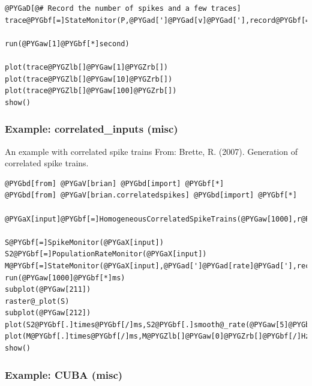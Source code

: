 \documentclass[letterpaper,10pt,english]{manual}
\begin{document}
\begin{Verbatim}[commandchars=@\[\]]
@PYGaD[@# Record the number of spikes and a few traces]
trace@PYGbf[=]StateMonitor(P,@PYGad[']@PYGad[v]@PYGad['],record@PYGbf[=]@PYGZlb[]@PYGaw[1],@PYGaw[10],@PYGaw[100]@PYGZrb[])

run(@PYGaw[1]@PYGbf[*]second)

plot(trace@PYGZlb[]@PYGaw[1]@PYGZrb[])
plot(trace@PYGZlb[]@PYGaw[10]@PYGZrb[])
plot(trace@PYGZlb[]@PYGaw[100]@PYGZrb[])
show()
\end{Verbatim}

\resetcurrentobjects
\hypertarget{--doc-examples-misc_correlated_inputs}{}

\hypertarget{index-61}{}\subsubsection{Example: correlated\_inputs (misc)}

An example with correlated spike trains
From: Brette, R. (2007). Generation of correlated spike trains.

\begin{Verbatim}[commandchars=@\[\]]
@PYGbd[from] @PYGaV[brian] @PYGbd[import] @PYGbf[*]
@PYGbd[from] @PYGaV[brian.correlatedspikes] @PYGbd[import] @PYGbf[*]

@PYGaX[input]@PYGbf[=]HomogeneousCorrelatedSpikeTrains(@PYGaw[1000],r@PYGbf[=]@PYGaw[10]@PYGbf[*]Hz,c@PYGbf[=]@PYGaw[0.1],tauc@PYGbf[=]@PYGaw[10]@PYGbf[*]ms)

S@PYGbf[=]SpikeMonitor(@PYGaX[input])
S2@PYGbf[=]PopulationRateMonitor(@PYGaX[input])
M@PYGbf[=]StateMonitor(@PYGaX[input],@PYGad[']@PYGad[rate]@PYGad['],record@PYGbf[=]@PYGaw[0])
run(@PYGaw[1000]@PYGbf[*]ms)
subplot(@PYGaw[211])
raster@_plot(S)
subplot(@PYGaw[212])
plot(S2@PYGbf[.]times@PYGbf[/]ms,S2@PYGbf[.]smooth@_rate(@PYGaw[5]@PYGbf[*]ms))
plot(M@PYGbf[.]times@PYGbf[/]ms,M@PYGZlb[]@PYGaw[0]@PYGZrb[]@PYGbf[/]Hz)
show()
\end{Verbatim}

\resetcurrentobjects
\hypertarget{--doc-examples-misc_CUBA}{}

\hypertarget{index-53}{}\subsubsection{Example: CUBA (misc)}
\end{document}
